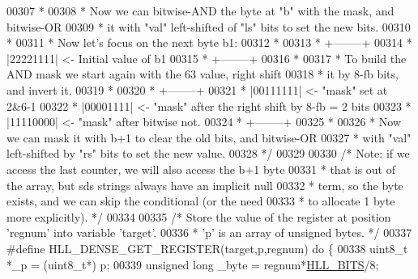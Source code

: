 \begin{DoxyCode}
{{00307 \textcolor{comment}{ *}
00308 \textcolor{comment}{ * Now we can bitwise-AND the byte at "b" with the mask, and bitwise-OR}
00309 \textcolor{comment}{ * it with "val" left-shifted of "ls" bits to set the new bits.}
00310 \textcolor{comment}{ *}
00311 \textcolor{comment}{ * Now let's focus on the next byte b1:}
00312 \textcolor{comment}{ *}
00313 \textcolor{comment}{ *   +--------+}
00314 \textcolor{comment}{ *   |22221111|  <- Initial value of b1}
00315 \textcolor{comment}{ *   +--------+}
00316 \textcolor{comment}{ *}
00317 \textcolor{comment}{ * To build the AND mask we start again with the 63 value, right shift}
00318 \textcolor{comment}{ * it by 8-fb bits, and invert it.}
00319 \textcolor{comment}{ *}
00320 \textcolor{comment}{ *   +--------+}
00321 \textcolor{comment}{ *   |00111111|  <- "mask" set at 2&6-1}
00322 \textcolor{comment}{ *   |00001111|  <- "mask" after the right shift by 8-fb = 2 bits}
00323 \textcolor{comment}{ *   |11110000|  <- "mask" after bitwise not.}
00324 \textcolor{comment}{ *   +--------+}
00325 \textcolor{comment}{ *}
00326 \textcolor{comment}{ * Now we can mask it with b+1 to clear the old bits, and bitwise-OR}
00327 \textcolor{comment}{ * with "val" left-shifted by "rs" bits to set the new value.}
00328 \textcolor{comment}{ */}
00329 
00330 \textcolor{comment}{/* Note: if we access the last counter, we will also access the b+1 byte}
00331 \textcolor{comment}{ * that is out of the array, but sds strings always have an implicit null}
00332 \textcolor{comment}{ * term, so the byte exists, and we can skip the conditional (or the need}
00333 \textcolor{comment}{ * to allocate 1 byte more explicitly). */}
00334 
00335 \textcolor{comment}{/* Store the value of the register at position 'regnum' into variable 'target'.}
00336 \textcolor{comment}{ * 'p' is an array of unsigned bytes. */}
00337 \textcolor{preprocessor}{#}\textcolor{preprocessor}{define} \textcolor{preprocessor}{HLL\_DENSE\_GET\_REGISTER}\textcolor{preprocessor}{(}\textcolor{preprocessor}{target}\textcolor{preprocessor}{,}\textcolor{preprocessor}{p}\textcolor{preprocessor}{,}\textcolor{preprocessor}{regnum}\textcolor{preprocessor}{)} \textcolor{keywordflow}{do} \textcolor{preprocessor}{\{}
00338     \textcolor{preprocessor}{uint8\_t} \textcolor{preprocessor}{*}\textcolor{preprocessor}{\_p} \textcolor{preprocessor}{=} \textcolor{preprocessor}{(}\textcolor{preprocessor}{uint8\_t}\textcolor{preprocessor}{*}\textcolor{preprocessor}{)} \textcolor{preprocessor}{p}\textcolor{preprocessor}{;}
00339     \textcolor{keywordtype}{unsigned} \textcolor{keywordtype}{long} \textcolor{preprocessor}{\_byte} \textcolor{preprocessor}{=} \textcolor{preprocessor}{regnum}\textcolor{preprocessor}{*}\hyperlink{hyperloglog_8c_a9023d37e2b4b782b2b922d9599894d14}{HLL\_BITS}\textcolor{preprocessor}{/}8\textcolor{preprocessor}{;}
}}
\end{DoxyCode}
